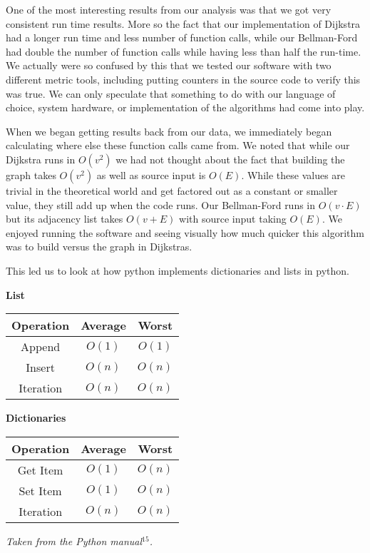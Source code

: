 \documentclass{article}
\begin{document}
\vspace{15 pt}
One of the most interesting results from our analysis was that we got very consistent run time results. More so the fact that our implementation of Dijkstra had a longer run time and less number of function calls, while our Bellman-Ford had double the number of function calls while having less than half the run-time. We actually were so confused by this that we tested our software with two different metric tools, including putting counters in the source code to verify this was true. We can only speculate that something to do with our language of choice, system hardware, or implementation of the algorithms had come into play.

When we began getting results back from our data, we immediately began calculating where else these function calls came from. We noted that while our Dijkstra runs in $O(v^2)$ we had not thought about the fact that building the graph takes $O(v^2)$ as well as source input is $O(E)$. While these values are trivial in the theoretical world and get factored out as a constant or smaller value, they still add up when the code runs. 
Our Bellman-Ford runs in $O(v \cdot E)$ but its adjacency list takes $O(v+E)$ with source input taking $O(E)$. We enjoyed running the software and seeing visually how much quicker this algorithm was to build versus the graph in Dijkstras.

This led us to look at how python implements dictionaries and lists in python.
\begin{multicols}{2}

\hspace{35 pt} \textbf{List}\\
\centering
\begin{tabular}{||c|c|c||}
\hline
Operation & Average & Worst \\
\hline
Append & $O(1)$ & $O(1)$ \\
\hline
Insert & $O(n)$ & $O(n)$ \\
\hline
Iteration & $O(n)$  & $O(n)$ \\
\hline
\end{tabular}

\hspace{5 pt} \textbf{Dictionaries}\\
\centering
\begin{tabular}{||c|c|c||}
\hline
Operation & Average & Worst \\
\hline
Get Item & $O(1)$ & $O(n)$ \\
\hline
Set Item & $O(1)$ & $O(n)$ \\
\hline
Iteration & $O(n)$  & $O(n)$ \\
\hline
\end{tabular}
\end{multicols}
\hspace{50 mm} \textit{Taken from the Python manual$^{15}$.}
\end{document}
